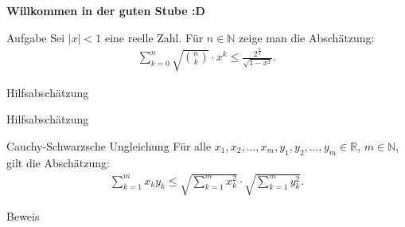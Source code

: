 \documentclass[10pt]{beamer}
\title{}
\author{Artur's Mathematikstübchen}
\date{}
\def\bN{\mathbb{N}}
\def\bR{\mathbb{R}}
\begin{document}

\begin{frame}
    \begin{center}
        \textbf{\huge Willkommen in der guten Stube \newline \newline :D}
    \end{center}
\end{frame}




\begin{frame}
    \begin{alertblock}{Aufgabe}
        Sei \( \left\vert x \right\vert < 1 \) eine reelle Zahl. Für \( n \in \bN \) zeige man die Abschätzung:
        \begin{align*}
            \sum_{k = 0}^{n} \sqrt{\binom{n}{k}} \cdot x^{k}
            \leq \frac{2^{\frac{n}{2}}}{\sqrt{1 - x^{2}}}.
        \end{align*}
    \end{alertblock}
\end{frame}



\begin{frame}{Hilfsabschätzung}
    
\end{frame}



\begin{frame}{Hilfsabschätzung}
    \begin{block}{Cauchy-Schwarzsche Ungleichung}
        Für alle \( x_{1}, x_{2}, \ldots, x_{m}, y_{1}, y_{2}, \ldots, y_{m} \in \bR \), \( m \in \bN \), gilt die Abschätzung:
        \begin{align*}
            \sum_{k = 1}^{m} x_{k} y_{k}
            \leq \sqrt{\sum_{k = 1}^{m} x_{k}^{2}} \cdot \sqrt{\sum_{k = 1}^{m} y_{k}^{2}}.
        \end{align*}
    \end{block}
\end{frame}



\begin{frame}{Beweis}
    
\end{frame}
\end{document}
